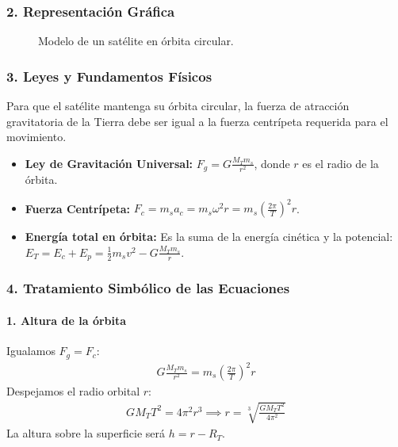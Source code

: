 \subsubsection*{2. Representación Gráfica}
\begin{figure}[H]
    \centering
    \caption{Modelo de un satélite en órbita circular.}
\end{figure}

\subsubsection*{3. Leyes y Fundamentos Físicos}
Para que el satélite mantenga su órbita circular, la fuerza de atracción gravitatoria de la Tierra debe ser igual a la fuerza centrípeta requerida para el movimiento.
\begin{itemize}
    \item \textbf{Ley de Gravitación Universal:} $F_g = G \frac{M_T m_s}{r^2}$, donde $r$ es el radio de la órbita.
    \item \textbf{Fuerza Centrípeta:} $F_c = m_s a_c = m_s \omega^2 r = m_s \left(\frac{2\pi}{T}\right)^2 r$.
    \item \textbf{Energía total en órbita:} Es la suma de la energía cinética y la potencial: $E_T = E_c + E_p = \frac{1}{2}m_s v^2 - G\frac{M_T m_s}{r}$.
\end{itemize}

\subsubsection*{4. Tratamiento Simbólico de las Ecuaciones}
\paragraph{1. Altura de la órbita}
Igualamos $F_g = F_c$:
\begin{gather}
    G \frac{M_T m_s}{r^2} = m_s \left(\frac{2\pi}{T}\right)^2 r
\end{gather}
Despejamos el radio orbital $r$:
\begin{gather}
    G M_T T^2 = 4\pi^2 r^3 \implies r = \sqrt[3]{\frac{G M_T T^2}{4\pi^2}}
\end{gather}
La altura sobre la superficie será $h = r - R_T$.

